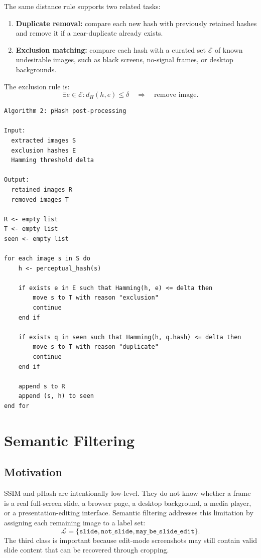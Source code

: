 \documentclass[11pt]{article}
\begin{document}
The same distance rule supports two related tasks:
\begin{enumerate}
  \item \textbf{Duplicate removal:} compare each new hash with previously retained hashes and remove it if a near-duplicate already exists.
  \item \textbf{Exclusion matching:} compare each hash with a curated set $\mathcal{E}$ of known undesirable images, such as black screens, no-signal frames, or desktop backgrounds.
\end{enumerate}

The exclusion rule is:
\[
\exists e \in \mathcal{E}:
d_H(h,e) \le \delta
\quad \Longrightarrow \quad
\text{remove image}.
\]

\begin{verbatim}
Algorithm 2: pHash post-processing

Input:
  extracted images S
  exclusion hashes E
  Hamming threshold delta

Output:
  retained images R
  removed images T

R <- empty list
T <- empty list
seen <- empty list

for each image s in S do
    h <- perceptual_hash(s)

    if exists e in E such that Hamming(h, e) <= delta then
        move s to T with reason "exclusion"
        continue
    end if

    if exists q in seen such that Hamming(h, q.hash) <= delta then
        move s to T with reason "duplicate"
        continue
    end if

    append s to R
    append (s, h) to seen
end for
\end{verbatim}

\section{Semantic Filtering}

\subsection{Motivation}

SSIM and pHash are intentionally low-level. They do not know whether a frame is a real full-screen slide, a browser page, a desktop background, a media player, or a presentation-editing interface. Semantic filtering addresses this limitation by assigning each remaining image to a label set:
\[
\mathcal{L}=\{\texttt{slide},\texttt{not\_slide},\texttt{may\_be\_slide\_edit}\}.
\]
The third class is important because edit-mode screenshots may still contain valid slide content that can be recovered through cropping.
\end{document}
